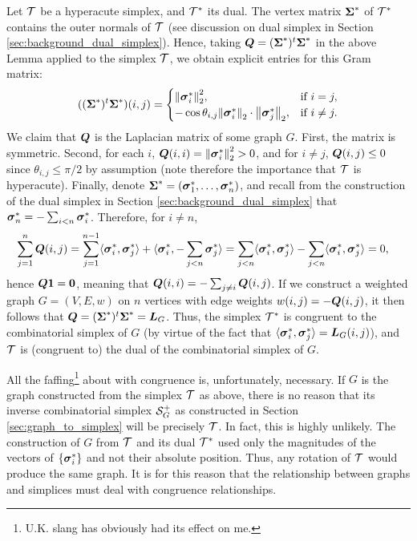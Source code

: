 Let $\mathcal{T}$ be a hyperacute simplex, and $\mathcal{T}^*$ its dual. The vertex matrix $\boldsymbol{\Sigma}^*$ of $\mathcal{T}^*$ contains the outer normals of $\mathcal{T}$ (see discussion on dual simplex in Section \ref{sec:background_dual_simplex}). Hence, taking $\vb*{Q}=(\boldsymbol{\Sigma}^*)^t \boldsymbol{\Sigma}^*$ in the above Lemma applied to the simplex $\mathcal{T}$, we obtain explicit entries for this Gram matrix:  
\begin{equation*}
    ((\boldsymbol{\Sigma}^*)^t \boldsymbol{\Sigma}^*)(i,j) = \begin{cases}
    \norm{\vb*{\sigma}_i^*}_2^{2},& \text{if }i=j,\\
-\cos\theta_{i,j} \norm{\vb*{\sigma}_i^*}_2\cdot \norm{\vb*{\sigma}_j^*}_2,& \text{if }i\neq j.
    \end{cases}
\end{equation*}
We claim that $\vb*{Q}$ is the Laplacian matrix of some graph $G$. First, the matrix is symmetric. Second,
for each $i$, $\vb*{Q}(i,i)=\norm{\vb*{\sigma}_i^*}_2^{2}>0$, and for $i\neq j$, $\vb*{Q}(i,j) \leq 0$ since $\theta_{i,j}\leq \pi/2$ by assumption (note therefore the importance that $\mathcal{T}$ is hyperacute). Finally, denote $\boldsymbol{\Sigma}^*=(\vb*{\sigma}_1^*,\dots,\vb*{\sigma}^*_n)$, and recall from the construction of the dual simplex in Section \ref{sec:background_dual_simplex} that $\vb*{\sigma}_n^*=-\sum_{i<n}\vb*{\sigma}^*_i$. Therefore, for $i\neq n$, 
\begin{align*}
    \sum_{j=1}^n \vb*{Q}(i,j) &= \sum_{j=1}^{n-1} \langle \vb*{\sigma}^*_i,\vb*{\sigma}^*_j\rangle + \langle \vb*{\sigma}^*_i,-\sum_{j<n}\vb*{\sigma}_j^*\rangle = \sum_{j<n}\langle \vb*{\sigma}^*_i,\vb*{\sigma}^*_j\rangle - \sum_{j<n}\langle \vb*{\sigma}^*_i,\vb*{\sigma}^*_j\rangle  = 0,
\end{align*}
hence $\vb*{Q}\vb{1}=\vb{0}$, meaning that $\vb*{Q}(i,i) = -\sum_{j\neq i}\vb*{Q}(i,j)$. 
If we construct a weighted graph $G=(V,E,w)$ on $n$ vertices with edge weights $w(i,j) = -\vb*{Q}(i,j)$, it then follows that $\vb*{Q}=(\boldsymbol{\Sigma}^*)^t\boldsymbol{\Sigma}^*=\vb*{L}_G$. Thus, the simplex $\mathcal{T}^*$ is congruent to the combinatorial simplex of $G$ (by virtue of the fact  that $\langle \vb*{\sigma}_i^*,\vb*{\sigma}_j^*\rangle = \vb*{L}_G(i,j)$), and $\mathcal{T}$ is (congruent to) the dual of the combinatorial simplex of $G$. 

\begin{remark}
	All the faffing\footnote{U.K. slang has obviously had its effect on me.} about with congruence is, unfortunately, necessary. If $G$ is the graph constructed from the simplex $\mathcal{T}$ as above, there is no reason that its inverse combinatorial simplex $\mathcal{S}^+_G$ as constructed in Section \ref{sec:graph_to_simplex} will be precisely $\mathcal{T}$. In fact, this is highly unlikely. The construction of $G$ from $\mathcal{T}$ and its dual $\mathcal{T}^*$ used only the magnitudes of the vectors of $\{\vb*{\sigma}_i^*\}$ and not their absolute position. Thus, any rotation of $\mathcal{T}$ would produce the same graph. It is for this reason that the relationship between graphs and simplices must deal with congruence  relationships. 
\end{remark}


